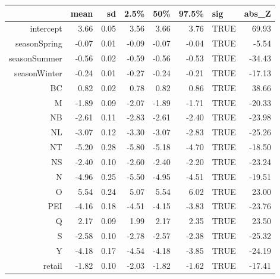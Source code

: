 \documentclass[12pt]{article}
\begin{document}
\begin{table}[ht]
    \centering
    \begin{tabular}{rrrrrrlr}
      \hline
     & mean & sd & 2.5\% & 50\% & 97.5\% & sig & abs\_Z \\ 
      \hline
    intercept & 3.66 & 0.05 & 3.56 & 3.66 & 3.76 & TRUE & 69.93 \\ 
      seasonSpring & -0.07 & 0.01 & -0.09 & -0.07 & -0.04 & TRUE & -5.54 \\ 
      seasonSummer & -0.56 & 0.02 & -0.59 & -0.56 & -0.53 & TRUE & -34.43 \\ 
      seasonWinter & -0.24 & 0.01 & -0.27 & -0.24 & -0.21 & TRUE & -17.13 \\ 
      BC & 0.82 & 0.02 & 0.78 & 0.82 & 0.86 & TRUE & 38.66 \\ 
      M & -1.89 & 0.09 & -2.07 & -1.89 & -1.71 & TRUE & -20.33 \\ 
      NB & -2.61 & 0.11 & -2.83 & -2.61 & -2.40 & TRUE & -23.98 \\ 
      NL & -3.07 & 0.12 & -3.30 & -3.07 & -2.83 & TRUE & -25.26 \\ 
      NT & -5.20 & 0.28 & -5.80 & -5.18 & -4.70 & TRUE & -18.50 \\ 
      NS & -2.40 & 0.10 & -2.60 & -2.40 & -2.20 & TRUE & -23.24 \\ 
      N & -4.96 & 0.25 & -5.50 & -4.95 & -4.51 & TRUE & -19.51 \\ 
      O & 5.54 & 0.24 & 5.07 & 5.54 & 6.02 & TRUE & 23.00 \\ 
      PEI & -4.16 & 0.18 & -4.51 & -4.15 & -3.83 & TRUE & -23.76 \\ 
      Q & 2.17 & 0.09 & 1.99 & 2.17 & 2.35 & TRUE & 23.50 \\ 
      S & -2.58 & 0.10 & -2.78 & -2.57 & -2.38 & TRUE & -25.32 \\ 
      Y & -4.18 & 0.17 & -4.54 & -4.18 & -3.85 & TRUE & -24.19 \\ 
      retail & -1.82 & 0.10 & -2.03 & -1.82 & -1.62 & TRUE & -17.41 \\ 
       \hline
    \end{tabular}
    \end{table}
    
 
\end{document}
